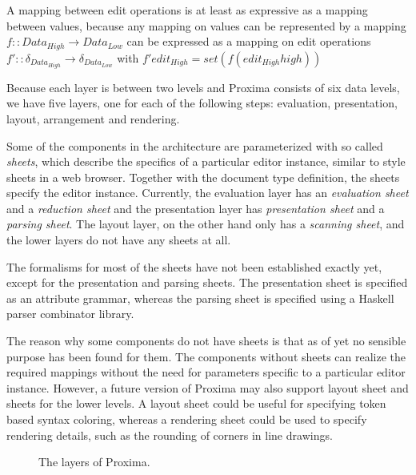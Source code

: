 A mapping between edit operations is at least as expressive as a mapping between values, because any 
mapping on values can be represented by a mapping 
$f :: Data_{High} \rightarrow Data_{Low}$ can be expressed as a mapping on edit operations
$f' ::  \delta_{Data_{High}} \rightarrow \delta_{Data_{Low}}$ with $f' edit_{High} = set (f (edit_{High}high))$
\ec


Because each layer is between two levels and Proxima  consists of six data levels, we have five layers, one for each of the following steps: evaluation, presentation, layout, arrangement and rendering.

Some of the components in the architecture are parameterized with so called {\em sheets}, which describe the specifics of a particular editor instance, similar to style sheets in a web browser. Together with the document type definition, the sheets specify the editor instance. Currently, the evaluation layer has an {\em evaluation sheet} and a {\em reduction sheet} and the presentation layer has {\em presentation sheet} and a {\em parsing sheet}.  The layout layer, on the other hand only has a {\em scanning sheet}, and the lower layers do not have any sheets at all. 

The formalisms for most of the sheets have not been established exactly yet, except for the presentation and parsing sheets. The presentation sheet is specified as an attribute grammar, whereas the parsing sheet is specified using a Haskell parser combinator library.

The reason why some components do not have sheets is that as of yet no sensible purpose has been found for them. The components without sheets can realize the required mappings without the need for parameters specific to a particular editor instance. However, a future version of Proxima may also support layout sheet and sheets for the lower levels. A layout sheet could be useful for specifying token based syntax coloring, whereas a rendering sheet could be used to specify rendering details, such as the rounding of corners in line drawings.

\begin{figure}
\begin{small}
\begin{center}
\begin{center}
\end{center}\caption{The layers of Proxima.}\label{proxLayers} 
\end{center}
\end{small}
\end{figure}

